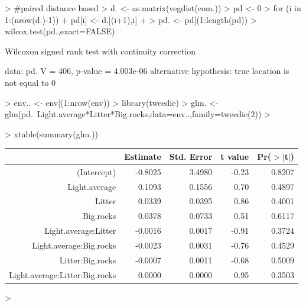 \documentclass[12pt]{article}
\begin{document}




\begin{Schunk}
\begin{Sinput}
>                                         #paired distance based
> d. <- as.matrix(vegdist(com.))
> pd <- 0
> for (i in 1:(nrow(d.)-1)){
+   pd[i] <- d.[(i+1),i]
+ }
> pd. <- pd[(1:length(pd)) %
> wilcox.test(pd.,exact=FALSE)
\end{Sinput}
\begin{Soutput}
	Wilcoxon signed rank test with continuity correction

data:  pd. 
V = 406, p-value = 4.003e-06
alternative hypothesis: true location is not equal to 0 
\end{Soutput}
\begin{Sinput}
> env.. <- env[(1:nrow(env)) %
> library(tweedie)
> glm. <- glm(pd.~Light.average*Litter*Big.rocks,data=env..,family=tweedie(2))
> 
\end{Sinput}
\end{Schunk}

\begin{Schunk}
\begin{Sinput}
> xtable(summary(glm.))
\end{Sinput}
\begin{table}[ht]
\begin{center}
\begin{tabular}{rrrrr}
  \hline
 & Estimate & Std. Error & t value & Pr($>$$|$t$|$) \\ 
  \hline
(Intercept) & -0.8025 & 3.4980 & -0.23 & 0.8207 \\ 
  Light.average & 0.1093 & 0.1556 & 0.70 & 0.4897 \\ 
  Litter & 0.0339 & 0.0395 & 0.86 & 0.4001 \\ 
  Big.rocks & 0.0378 & 0.0733 & 0.51 & 0.6117 \\ 
  Light.average:Litter & -0.0016 & 0.0017 & -0.91 & 0.3724 \\ 
  Light.average:Big.rocks & -0.0023 & 0.0031 & -0.76 & 0.4529 \\ 
  Litter:Big.rocks & -0.0007 & 0.0011 & -0.68 & 0.5009 \\ 
  Light.average:Litter:Big.rocks & 0.0000 & 0.0000 & 0.95 & 0.3503 \\ 
   \hline
\end{tabular}
\end{center}
\end{table}\begin{Sinput}
> 
\end{Sinput}
\end{Schunk}
\end{document}
